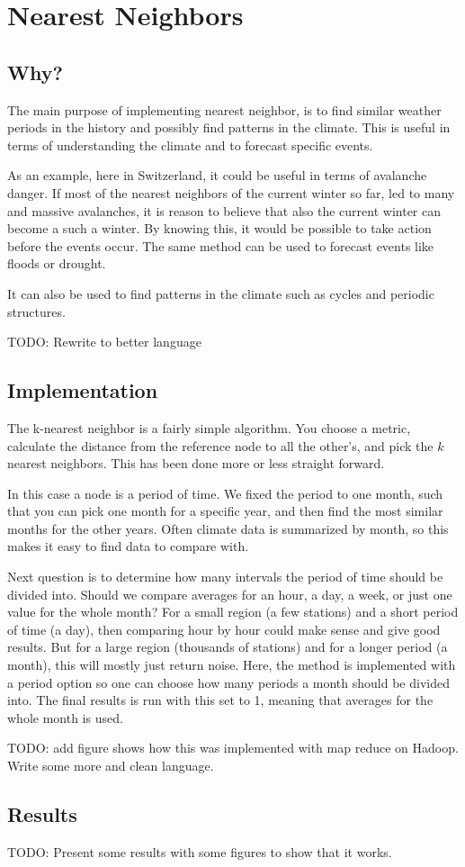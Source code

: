\section{Nearest Neighbors}

\subsection{Why?} %
\label{sub:why_}

The main purpose of implementing nearest neighbor, is to find similar weather periods in the history and possibly find patterns in the climate. This is useful in terms of understanding the climate and to forecast specific events. 

As an example, here in Switzerland, it could be useful in terms of avalanche danger. If most of the nearest neighbors of the current winter so far, led to many and massive avalanches, it is reason to believe that also the current winter can become a such a winter. By knowing this, it would
be possible to take action before the events occur. The same method can be used to forecast events like floods or drought.  

It can also be used to find patterns in the climate such as cycles and periodic structures. 

TODO: Rewrite to better language

\subsection{Implementation} %
\label{sub:implementation}

The k-nearest neighbor is a fairly simple algorithm. You choose a metric, calculate the distance from the reference node to all the other's, and pick the
$k$ nearest neighbors. This has been done more or less straight forward.

In this case a node is a period of time. We fixed the period to one month, such that you can pick one month for a specific year, and then find the most similar months for the other years. Often climate data is summarized by month, so this makes it easy to find data to compare with.

Next question is to determine how many intervals the period of time should be divided into. Should we compare averages for an hour, a day, a week, or just one value for the whole month? For a small region (a few stations) and a short period of time (a day), then comparing hour by hour could make sense and give good results. But for a large region (thousands of stations) and for a longer period (a month), this will mostly just return noise. Here, the method is implemented with a period option so one can choose how many periods a month should be divided into. The final results is run with this set to 1, meaning that averages for the whole month is used. 

TODO: add figure shows how this was implemented with map reduce on Hadoop. Write some more and clean language.

\subsection{Results} %
\label{sub:results}

TODO: Present some results with some figures to show that it works.



